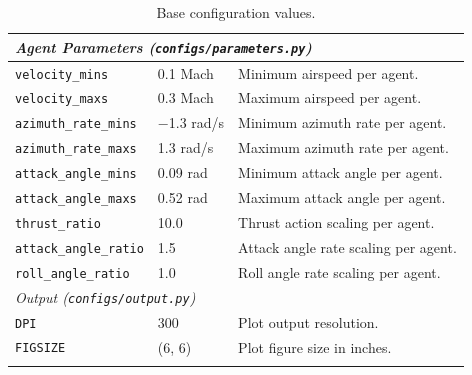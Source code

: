 \begin{longtable}{l@{\hspace{1cm}}l@{\hspace{1cm}}p{}}
\midrule
\multicolumn{3}{l}{\textit{Agent Parameters (\texttt{configs/parameters.py})}} \\
\midrule
\texttt{velocity\_mins} & 0.1 Mach & Minimum airspeed per agent. \\
\texttt{velocity\_maxs} & 0.3 Mach & Maximum airspeed per agent. \\
\texttt{azimuth\_rate\_mins} & $-$1.3 rad/s & Minimum azimuth rate per agent. \\
\texttt{azimuth\_rate\_maxs} & 1.3 rad/s & Maximum azimuth rate per agent. \\
\texttt{attack\_angle\_mins} & 0.09 rad & Minimum attack angle per agent. \\
\texttt{attack\_angle\_maxs} & 0.52 rad & Maximum attack angle per agent. \\
\texttt{thrust\_ratio} & 10.0 & Thrust action scaling per agent. \\
\texttt{attack\_angle\_ratio} & 1.5 & Attack angle rate scaling per agent. \\
\texttt{roll\_angle\_ratio} & 1.0 & Roll angle rate scaling per agent. \\
\midrule
\multicolumn{3}{l}{\textit{Output (\texttt{configs/output.py})}} \\
\midrule
\texttt{DPI} & 300 & Plot output resolution. \\
\texttt{FIGSIZE} & (6, 6) & Plot figure size in inches. \\
\caption{Base configuration values.}
\label{tab:config}
\end{longtable}